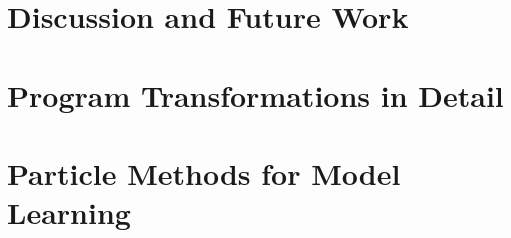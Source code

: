 

\section{Discussion and Future Work}
\label{sec:disc}



\section{Program Transformations in Detail}
\label{sec:program-transformations}


\section{Particle Methods for Model Learning}
\label{sec:part:learning}